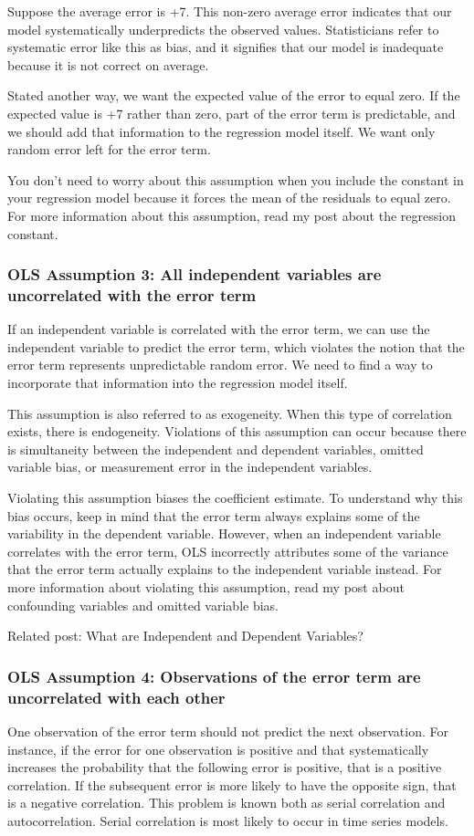 \documentclass[12pt]{book}
\begin{document}
Suppose the average error is +7. This non-zero average error indicates that our model systematically underpredicts the observed values. Statisticians refer to systematic error like this as bias, and it signifies that our model is inadequate because it is not correct on average.

Stated another way, we want the expected value of the error to equal zero. If the expected value is +7 rather than zero, part of the error term is predictable, and we should add that information to the regression model itself. We want only random error left for the error term.

You don’t need to worry about this assumption when you include the constant in your regression model because it forces the mean of the residuals to equal zero. For more information about this assumption, read my post about the regression constant.

\subsubsection{OLS Assumption 3: All independent variables are uncorrelated with the error term}
If an independent variable is correlated with the error term, we can use the independent variable to predict the error term, which violates the notion that the error term represents unpredictable random error. We need to find a way to incorporate that information into the regression model itself.

This assumption is also referred to as exogeneity. When this type of correlation exists, there is endogeneity. Violations of this assumption can occur because there is simultaneity between the independent and dependent variables, omitted variable bias, or measurement error in the independent variables.

Violating this assumption biases the coefficient estimate. To understand why this bias occurs, keep in mind that the error term always explains some of the variability in the dependent variable. However, when an independent variable correlates with the error term, OLS incorrectly attributes some of the variance that the error term actually explains to the independent variable instead. For more information about violating this assumption, read my post about confounding variables and omitted variable bias.

Related post: What are Independent and Dependent Variables?

\subsubsection{OLS Assumption 4: Observations of the error term are uncorrelated with each other}
One observation of the error term should not predict the next observation. For instance, if the error for one observation is positive and that systematically increases the probability that the following error is positive, that is a positive correlation. If the subsequent error is more likely to have the opposite sign, that is a negative correlation. This problem is known both as serial correlation and autocorrelation. Serial correlation is most likely to occur in time series models.
\end{document}

